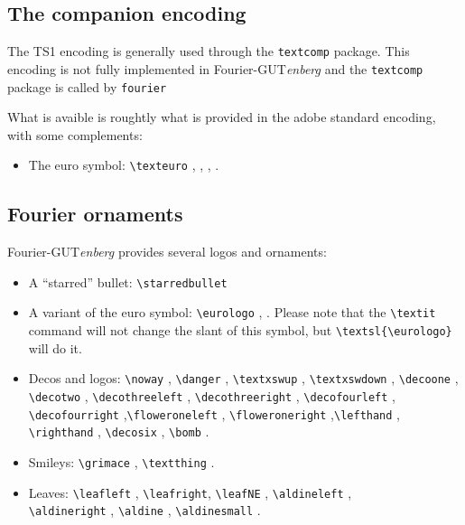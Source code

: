 \documentclass[a4paper,11pt]{article}
\newcommand{\fourier}{Fourier-GUT\textit{enberg}}
\begin{document}
\subsection{The companion encoding}
The  TS1 encoding is generally used through the 
 \verb=textcomp= package. This encoding is not fully implemented in \fourier{} 
 and the \verb=textcomp= package is called by \texttt{fourier}
 \par What is avaible is roughtly what is provided in the adobe standard encoding, with some complements:
\begin{itemize}
\item The euro symbol: \verb=\texteuro= \texteuro, 
\textit{\texteuro}, \textbf{\texteuro}, \textbf{\itshape\texteuro}.
\end{itemize}
\par
\subsection{Fourier ornaments}
\fourier{} provides several logos and ornaments:
\begin{itemize}
\item A ``starred'' bullet: \verb=\starredbullet= \starredbullet
\item A variant of the euro symbol: \verb=\eurologo= \eurologo, \textbf{\eurologo}. 
Please note that the \verb=\textit= command will not change the slant of this symbol, but \verb=\textsl{\eurologo}= \textsl{\eurologo} will do it.
\item Decos and logos: \verb=\noway= \noway, \verb=\danger= \danger, \verb=\textxswup= \textxswup,
\verb=\textxswdown= \textxswdown, \verb=\decoone= \decoone, \verb=\decotwo= \decotwo,
\verb=\decothreeleft= \decothreeleft, \verb=\decothreeright= \decothreeright, 
\verb=\decofourleft= \decofourleft, \verb=\decofourright= \decofourright,\verb=\floweroneleft= \floweroneleft,
\verb=\floweroneright= \floweroneright,\verb=\lefthand= \lefthand, \verb=\righthand= \righthand, \verb=\decosix= \decosix, \verb=\bomb= \bomb.
\item Smileys: \verb=\grimace= \grimace, \verb=\textthing= \textthing.
\item Leaves: \verb=\leafleft= \leafleft, \verb=\leafright=\leafright, \verb=\leafNE= \leafNE, \verb=\aldineleft= \aldineleft,
\\ \verb=\aldineright= \aldineright, \verb=\aldine= \aldine, \verb=\aldinesmall= \aldinesmall.
\end{itemize}
\end{document}
